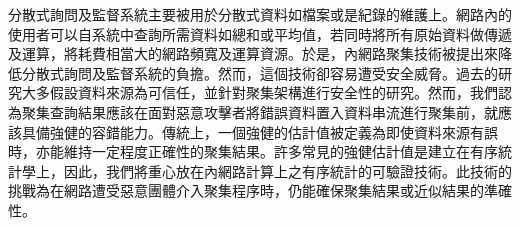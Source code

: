 
分散式詢問及監督系統主要被用於分散式資料如檔案或是紀錄的維護上。網路內的使用者可以自系統中查詢所需資料如總和或平均值，若同時將所有原始資料做傳遞及運算，將耗費相當大的網路頻寬及運算資源。於是，內網路聚集技術被提出來降低分散式詢問及監督系統的負擔。然而，這個技術卻容易遭受安全威脅。過去的研究大多假設資料來源為可信任，並針對聚集架構進行安全性的研究。然而，我們認為聚集查詢結果應該在面對惡意攻擊者將錯誤資料置入資料串流進行聚集前，就應該具備強健的容錯能力。傳統上，一個強健的估計值被定義為即使資料來源有誤時，亦能維持一定程度正確性的聚集結果。許多常見的強健估計值是建立在有序統計學上，因此，我們將重心放在內網路計算上之有序統計的可驗證技術。此技術的挑戰為在網路遭受惡意團體介入聚集程序時，仍能確保聚集結果或近似結果的準確性。
	